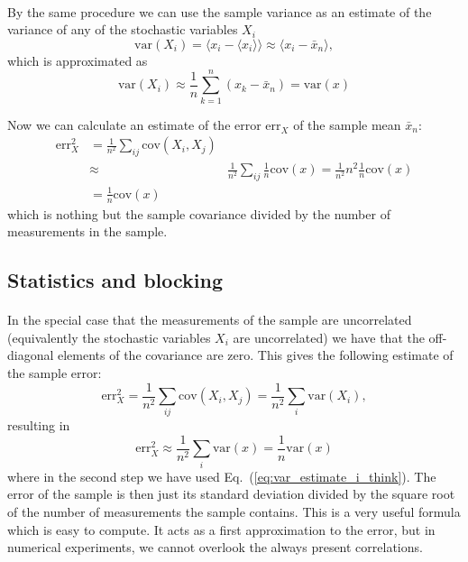 \documentclass[%
twoside,                 %
final,                   %
10pt]{article}
\begin{document}
\paragraph{}
By the same procedure we can use the sample variance as an
estimate of the variance of any of the stochastic variables $X_i$
\[
\mathrm{var}(X_i)=\langle x_i - \langle x_i\rangle\rangle \approx \langle x_i - \bar x_n\rangle\nonumber,
\]
which is approximated as 
\begin{equation}
\mathrm{var}(X_i)\approx \frac{1}{n}\sum_{k=1}^n (x_k - \bar x_n)=\mathrm{var}(x)
\label{eq:var_estimate_i_think}
\end{equation}

Now we can calculate an estimate of the error
$\mathrm{err}_X^{\phantom X}$ of the sample mean $\bar x_n$:
\begin{align}
\mathrm{err}_X^2
&=\frac{1}{n^2}\sum_{ij} \mathrm{cov}(X_i, X_j) \nonumber \\
&\approx&\frac{1}{n^2}\sum_{ij}\frac{1}{n}\mathrm{cov}(x) =\frac{1}{n^2}n^2\frac{1}{n}\mathrm{cov}(x)\nonumber\\
&=\frac{1}{n}\mathrm{cov}(x)
\label{eq:error_estimate}
\end{align}
which is nothing but the sample covariance divided by the number of
measurements in the sample.



\subsection*{Statistics and blocking}

\paragraph{}

In the special case that the measurements of the sample are
uncorrelated (equivalently the stochastic variables $X_i$ are
uncorrelated) we have that the off-diagonal elements of the covariance
are zero. This gives the following estimate of the sample error:
\[
\mathrm{err}_X^2=\frac{1}{n^2}\sum_{ij} \mathrm{cov}(X_i, X_j) =
\frac{1}{n^2} \sum_i \mathrm{var}(X_i),
\]
resulting in
\begin{equation}
\mathrm{err}_X^2\approx \frac{1}{n^2} \sum_i \mathrm{var}(x)= \frac{1}{n}\mathrm{var}(x)
\label{eq:error_estimate_uncorrel}
\end{equation}
where in the second step we have used Eq.~(\ref{eq:var_estimate_i_think}).
The error of the sample is then just its standard deviation divided by
the square root of the number of measurements the sample contains.
This is a very useful formula which is easy to compute. It acts as a
first approximation to the error, but in numerical experiments, we
cannot overlook the always present correlations.
\end{document}
